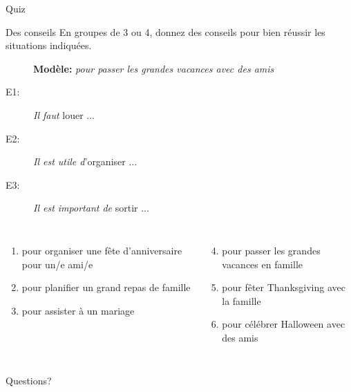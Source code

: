 \documentclass{beamer}
\begin{document}
  \begin{frame}{}
    \begin{center}
      \Large Quiz
    \end{center}
  \end{frame}

  \begin{frame}{Des conseils}
    \small
    En groupes de 3 ou 4, donnez des conseils pour bien réussir les situations indiquées.
    \begin{description}
      \item[] \textbf{Modèle:} \emph{pour passer les grandes vacances avec des amis}
      \item[E1:] \emph{Il faut} louer ...
      \item[E2:] \emph{Il est utile d}'organiser ...
      \item[E3:] \emph{Il est important de} sortir ...
    \end{description}
    \begin{columns}[t]
        \begin{enumerate}
          \item pour organiser une fête d'anniversaire pour un/e ami/e
          \item pour planifier un grand repas de famille
          \item pour assister à un mariage
        \end{enumerate}
        \begin{enumerate}
          \setcounter{enumi}{3}
          \item pour passer les grandes vacances en famille
          \item pour fêter Thanksgiving avec la famille
          \item pour célébrer Halloween avec des amis
        \end{enumerate}
    \end{columns}
  \end{frame}

  \begin{frame}{}
    \begin{center}
      \Large Questions?
    \end{center}
  \end{frame}
\end{document}
